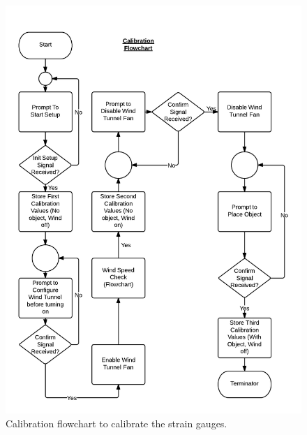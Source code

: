 	\begin{figure}[H]
		\centering
			\includegraphics[scale=0.375]{img/flowchart-calibrate}
		\caption{Calibration flowchart to calibrate the strain gauges.}
	\end{figure}
	
